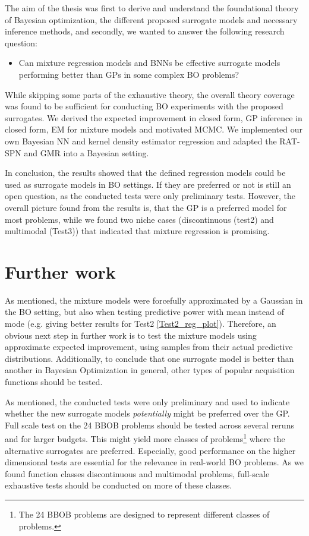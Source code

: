 The aim of the thesis was first to derive and understand the foundational theory of Bayesian
optimization, the different proposed surrogate models and necessary inference methods, and secondly,
we wanted to answer the following research question: 
\begin{itemize}
    \item Can mixture regression models and BNNs be effective surrogate models
    performing better than GPs in some complex BO problems? 
\end{itemize}

While skipping some parts of the exhaustive theory, the overall theory coverage was found to be
sufficient for conducting BO experiments with the proposed surrogates. We derived the expected
improvement in closed form, GP inference in closed form, EM for mixture models and motivated MCMC.
We implemented our own Bayesian NN and kernel density estimator regression and adapted the RAT-SPN
and GMR into a Bayesian setting.%

In conclusion, the results showed that the defined regression models could be used as surrogate
models in BO settings. If they are preferred or not is still an open question, as the conducted
tests were only preliminary tests. However, the overall picture found from the results is, that the
GP is a preferred model for most problems, while we found two niche cases (discontinuous (test2) and
multimodal (Test3)) that indicated that mixture regression is promising. 

\section{Further work}
As mentioned, the mixture models were forcefully approximated by a Gaussian in the BO setting, but
also when testing predictive power with mean instead of mode (e.g. giving better results for Test2
\ref{Test2_reg_plot}). Therefore, an obvious next step in further work is to test the mixture models
using approximate expected improvement, using samples from their actual predictive distributions.
Additionally, to conclude that one surrogate model is better than another in Bayesian Optimization
in general, other types of popular acquisition functions should be tested.

As mentioned, the conducted tests were only preliminary and used to indicate whether the new
surrogate models \textit{potentially} might be preferred over the GP. Full scale test on the 24 BBOB
problems should be tested across several reruns and for larger budgets. This might yield more
classes of problems\footnote{The 24 BBOB problems are designed to represent different classes of
problems.} where the alternative surrogates are preferred. Especially, good performance on the
higher dimensional tests are essential for the relevance in real-world BO problems. As we found
function classes discontinuous and multimodal problems, full-scale exhaustive tests should be
conducted on more of these classes. 

